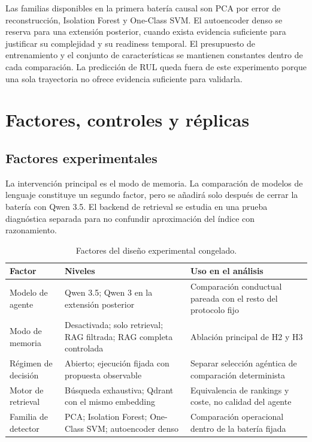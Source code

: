 Las familias disponibles en la primera batería causal son PCA por error de
reconstrucción, Isolation Forest y One-Class SVM. El autoencoder denso se
reserva para una extensión posterior, cuando exista evidencia suficiente para
justificar su complejidad y su readiness temporal. El
presupuesto de entrenamiento y el conjunto de características se mantienen
constantes dentro de cada comparación. La predicción de RUL queda fuera de este
experimento porque una sola trayectoria no ofrece evidencia suficiente para
validarla.

\section{Factores, controles y réplicas}

\subsection{Factores experimentales}

La intervención principal es el modo de memoria. La comparación de modelos de
lenguaje constituye un segundo factor, pero se añadirá solo después de cerrar
la batería con Qwen 3.5. El backend de retrieval se estudia en una prueba
diagnóstica separada para no confundir aproximación del índice con razonamiento.

\begin{table}[htbp]
\centering
\caption{Factores del diseño experimental congelado.}\label{tab:factores_experimentales}
\small
\begin{tabularx}{\textwidth}{>{\raggedright\arraybackslash}p{}>{\raggedright\arraybackslash}p{}Y}
\toprule
Factor & Niveles & Uso en el análisis \\
\midrule
Modelo de agente & Qwen 3.5; Qwen 3 en la extensión posterior & Comparación conductual pareada con el resto del protocolo fijo \\
Modo de memoria & Desactivada; solo retrieval; RAG filtrada; RAG completa controlada & Ablación principal de H2 y H3 \\
Régimen de decisión & Abierto; ejecución fijada con propuesta observable & Separar selección agéntica de comparación determinista \\
Motor de retrieval & Búsqueda exhaustiva; Qdrant con el mismo embedding & Equivalencia de rankings y coste, no calidad del agente \\
Familia de detector & PCA\@; Isolation Forest; One-Class SVM\@; autoencoder denso & Comparación operacional dentro de la batería fijada \\
\bottomrule
\end{tabularx}
\end{table}

